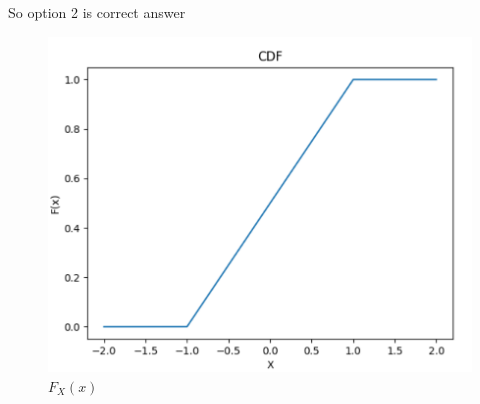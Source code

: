 \documentclass[journal,12pt,twocolumn]{IEEEtran}
\begin{document}
So option 2 is correct answer 
\begin{figure}[h]
    \centering
    \includegraphics[width=\columnwidth]{cdf.png}
    \caption{$F_{X}(x)$}
    \label{fig:$F_{X}(x)$}
\end{figure}
\end{document}
